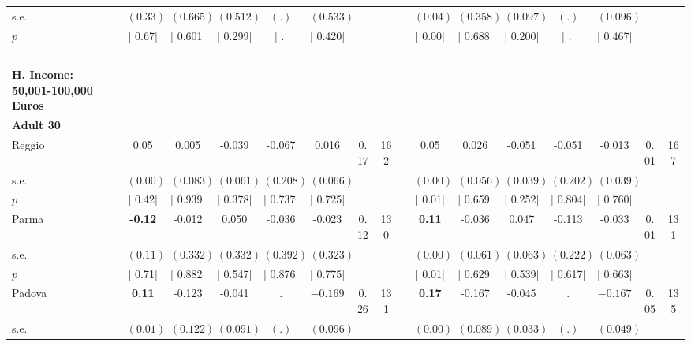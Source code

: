 \begin{longtable}{L{8em} c c c c c c c p{1em} c c c c c c c}
\quad \quad \quad \quad s.e.& $ (     0.33)$ & $ (    0.665)$ & $ (    0.512)$ & $ (        .)$ & $ (    0.533)$ & & & & $ (     0.04)$ & $ (    0.358)$ & $ (    0.097)$ & $ (        .)$ & $ (    0.096)$ & &  \\*
\quad \quad \quad \quad $ p$ & [     0.67] & [    0.601] & [    0.299] & [        .] & [    0.420] & & & & [     0.00] & [    0.688] & [    0.200] & [        .] & [    0.467] & &  \\[1em]
~\\[1em]
\textbf{H. Income: 50,001-100,000 Euros} \\*
\quad \quad \textbf{Adult 30} & & & & & & & & & & & & & & & \\* 
\quad \quad \quad Reggio& 0.05 &     0.005 &    -0.039 &    -0.067 &     0.016 &      0.17 &       162 & & 0.05 &     0.026 &    -0.051 &    -0.051 &    -0.013 &      0.01 &       167  \\*
\quad \quad \quad \quad s.e.& $ (     0.00)$ & $ (    0.083)$ & $ (    0.061)$ & $ (    0.208)$ & $ (    0.066)$ & & & & $ (     0.00)$ & $ (    0.056)$ & $ (    0.039)$ & $ (    0.202)$ & $ (    0.039)$ & &  \\*
\quad \quad \quad \quad $ p$ & [     0.42] & [    0.939] & [    0.378] & [    0.737] & [    0.725] & & & & [     0.01] & [    0.659] & [    0.252] & [    0.804] & [    0.760] & &  \\[1em]
\quad \quad \quad Parma& \textbf{    -0.12} &    -0.012 &     0.050 &    -0.036 &    -0.023 &      0.12 &       130 & & \textbf{     0.11} &    -0.036 &     0.047 &    -0.113 &    -0.033 &      0.01 &       131  \\*
\quad \quad \quad \quad s.e.& $ (     0.11)$ & $ (    0.332)$ & $ (    0.332)$ & $ (    0.392)$ & $ (    0.323)$ & & & & $ (     0.00)$ & $ (    0.061)$ & $ (    0.063)$ & $ (    0.222)$ & $ (    0.063)$ & &  \\*
\quad \quad \quad \quad $ p$ & [     0.71] & [    0.882] & [    0.547] & [    0.876] & [    0.775] & & & & [     0.01] & [    0.629] & [    0.539] & [    0.617] & [    0.663] & &  \\[1em]
\quad \quad \quad Padova& \textbf{     0.11} &    -0.123 &    -0.041 &         . & $ \mathbf{   -0.169}$ &      0.26 &       131 & & \textbf{     0.17} &    -0.167 &    -0.045 &         . & $ \mathbf{   -0.167}$ &      0.05 &       135  \\*
\quad \quad \quad \quad s.e.& $ (     0.01)$ & $ (    0.122)$ & $ (    0.091)$ & $ (        .)$ & $ (    0.096)$ & & & & $ (     0.00)$ & $ (    0.089)$ & $ (    0.033)$ & $ (        .)$ & $ (    0.049)$ & &  \\*

\end{longtable}
